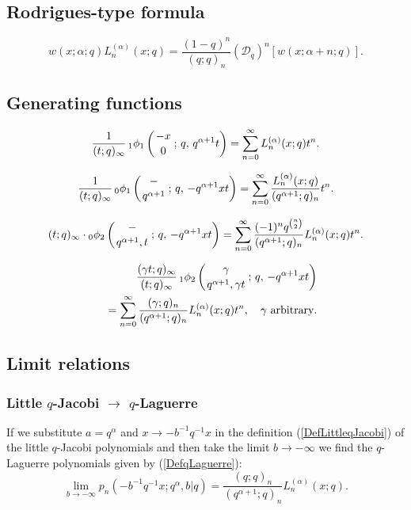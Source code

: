 \documentclass[envcountchap,graybox]{svmono}
\newcommand{\qhyp}[5]{\mbox{}_{#1}{\phi}_{#2}
\left(\genfrac{}{}{0pt}{}{#3}{#4}\,;\,q,\,#5\right)}
\newcommand{\qhyp}[5]{\,\mbox{}_{#1}\phi_{#2}\!\left(
  \genfrac{}{}{0pt}{}{#3}{#4};#5\right)}
\begin{document}
{{\subsection*{Rodrigues-type formula}
\begin{equation}
\label{RodqLaguerre}
w(x;\alpha;q)L_n^{(\alpha)}(x;q)=
\frac{(1-q)^n}{(q;q)_n}\left(\mathcal{D}_q\right)^n\left[w(x;\alpha+n;q)\right].
\end{equation}

\subsection*{Generating functions}
\begin{equation}
\label{GenqLaguerre1}
\frac{1}{(t;q)_{\infty}}\,\qhyp{1}{1}{-x}{0}{q^{\alpha+1}t}
=\sum_{n=0}^{\infty}L_n^{(\alpha)}(x;q)t^n.
\end{equation}

\begin{equation}
\label{GenqLaguerre2}
\frac{1}{(t;q)_{\infty}}\,\qhyp{0}{1}{-}{q^{\alpha+1}}{-q^{\alpha+1}xt}
=\sum_{n=0}^{\infty}\frac{L_n^{(\alpha)}(x;q)}{(q^{\alpha+1};q)_n}t^n.
\end{equation}

\begin{equation}
\label{GenqLaguerre3}
(t;q)_{\infty}\cdot\qhyp{0}{2}{-}{q^{\alpha+1},t}{-q^{\alpha+1}xt}
=\sum_{n=0}^{\infty}\frac{(-1)^nq^{\binom{n}{2}}}{(q^{\alpha+1};q)_n}L_n^{(\alpha)}(x;q)t^n.
\end{equation}

\begin{eqnarray}
\label{GenqLaguerre4}
& &\frac{(\gamma t;q)_{\infty}}{(t;q)_{\infty}}\,\qhyp{1}{2}{\gamma}{q^{\alpha+1},\gamma t}{-q^{\alpha+1}xt}\nonumber\\
& &{}=\sum_{n=0}^{\infty}\frac{(\gamma;q)_n}{(q^{\alpha+1};q)_n}L_n^{(\alpha)}(x;q)t^n,
\quad\textrm{$\gamma$ arbitrary}.
\end{eqnarray}

\subsection*{Limit relations}

\subsubsection*{Little $q$-Jacobi $\rightarrow$ $q$-Laguerre}
If we substitute $a=q^{\alpha}$ and $x\rightarrow -b^{-1}q^{-1}x$ in the definition
(\ref{DefLittleqJacobi}) of the little $q$-Jacobi polynomials and then take the limit
$b\rightarrow -\infty$ we find the $q$-Laguerre polynomials given by (\ref{DefqLaguerre}):
$$\lim_{b\rightarrow -\infty}p_n(-b^{-1}q^{-1}x;q^{\alpha},b|q)=
\frac{(q;q)_n}{(q^{\alpha+1};q)_n}L_n^{(\alpha)}(x;q).$$

}}
\end{document}
